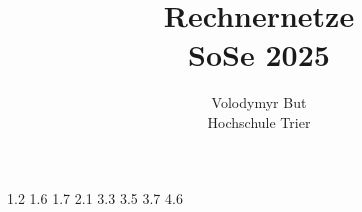 \documentclass[10pt, oneside]{article}
\title{Rechnernetze\\[10pt]\Large{SoSe 2025}}
\author{Volodymyr But\\[10pt]Hochschule Trier}
\date{}
\begin{document}
\maketitle
\vspace{25px}

{1.2}
{1.6}
{1.7}
{2.1}
{3.3}
{3.5}
\pagebreak
{3.7}
{4.6}
\end{document}
